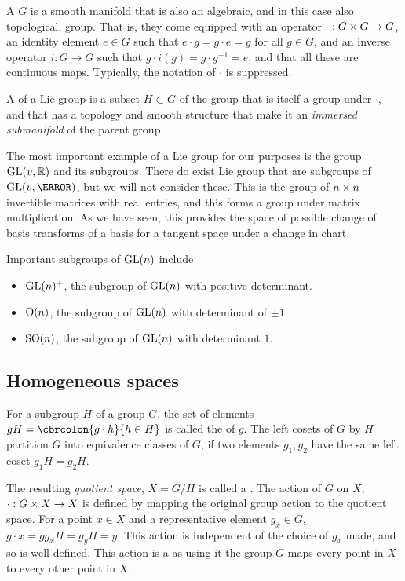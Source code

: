 A  \(G\) is a smooth manifold that is also an algebraic, and in this case also topological, group.
That is, they come equipped with an operator \(\cdot: G\x G\to G\), an identity element \(e\in G\) such that \(e \cdot g = g \cdot e = g\) for all  \(g\in G\), and an inverse operator \(i: G\to G\) such that \(g \cdot i(g) = g \cdot g^{-1} = e\), and that all these are continuous maps.
Typically, the notation of \(\cdot\) is suppressed.

A  of a Lie group is a subset \(H\subset G\) of the group that is itself a group under \(\cdot\), and that has a topology and smooth structure that make it an \emph{immersed submanifold} of the parent group.

The most important example of a Lie group for our purposes is the group \(\groupGL[v, \R]\) and its subgroups.
There do exist Lie group that are subgroups of \(\groupGL[v, \C]\), but we will not consider these.
This is the group of \(n\x n\) invertible matrices with real entries, and this forms a group under matrix multiplication.
As we have seen, this provides the space of possible change of basis transforms of a basis for a tangent space under a change in chart.

Important subgroups of \(\groupGL\) include
\begin{itemize}
	\item \(\groupGL^+\), the subgroup of \(\groupGL\) with positive determinant.
	\item \(\groupO\), the subgroup of \(\groupGL\) with determinant of \(\pm 1\).
	\item \(\groupSO\), the subgroup of \(\groupGL\) with determinant \(1\).
\end{itemize}

\subsection{Homogeneous spaces}
\label{def:homogeneous_space}
For a subgroup \(H\) of a group \(G\), the set of elements \(gH = \cbrcolon{g \cdot h}{h\in H}\) is called the  of \(g\).
The left cosets of \(G\) by \(H\) partition \(G\) into equivalence classes of \(G\), if two elements \(g_1, g_2\) have the same left coset \(g_1H = g_2H\). 

The resulting \emph{quotient space}, \(X = G/H\) is called a . The action of \(G\) on \(X\), \(\cdot: G \x X \to X\) is defined by mapping the original group action to the quotient space. For a point \(x\in X\) and a representative element \(g_x \in G\), \(g \cdot x = g g_x H = g_y H = y\). This action is independent of the choice of \(g_x\) made, and so is well-defined. This action is a   as using it the group \(G\) maps every point in \(X\) to every other point in \(X\).

